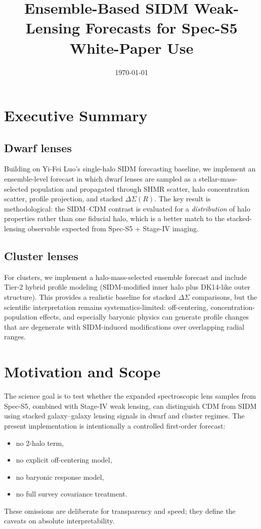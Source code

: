 \documentclass[11pt]{article}
\title{Ensemble-Based SIDM Weak-Lensing Forecasts for Spec-S5 White-Paper Use}
\author{}
\date{\today}
\begin{document}
\maketitle

\section{Executive Summary}

\subsection{Dwarf lenses}
Building on Yi-Fei Luo's single-halo SIDM forecasting baseline, we implement an ensemble-level forecast in which dwarf lenses are sampled as a stellar-mass-selected population and propagated through SHMR scatter, halo concentration scatter, profile projection, and stacked $\Delta\Sigma(R)$. The key result is methodological: the SIDM--CDM contrast is evaluated for a \emph{distribution} of halo properties rather than one fiducial halo, which is a better match to the stacked-lensing observable expected from Spec-S5 + Stage-IV imaging.

\subsection{Cluster lenses}
For clusters, we implement a halo-mass-selected ensemble forecast and include Tier-2 hybrid profile modeling (SIDM-modified inner halo plus DK14-like outer structure). This provides a realistic baseline for stacked $\Delta\Sigma$ comparisons, but the scientific interpretation remains systematics-limited: off-centering, concentration-population effects, and especially baryonic physics can generate profile changes that are degenerate with SIDM-induced modifications over overlapping radial ranges.

\section{Motivation and Scope}
The science goal is to test whether the expanded spectroscopic lens samples from Spec-S5, combined with Stage-IV weak lensing, can distinguish CDM from SIDM using stacked galaxy--galaxy lensing signals in dwarf and cluster regimes. The present implementation is intentionally a controlled first-order forecast:
\begin{itemize}[leftmargin=1.5em]
    \item no 2-halo term,
    \item no explicit off-centering model,
    \item no baryonic response model,
    \item no full survey covariance treatment.
\end{itemize}
These omissions are deliberate for transparency and speed; they define the caveats on absolute interpretability.
\end{document}
